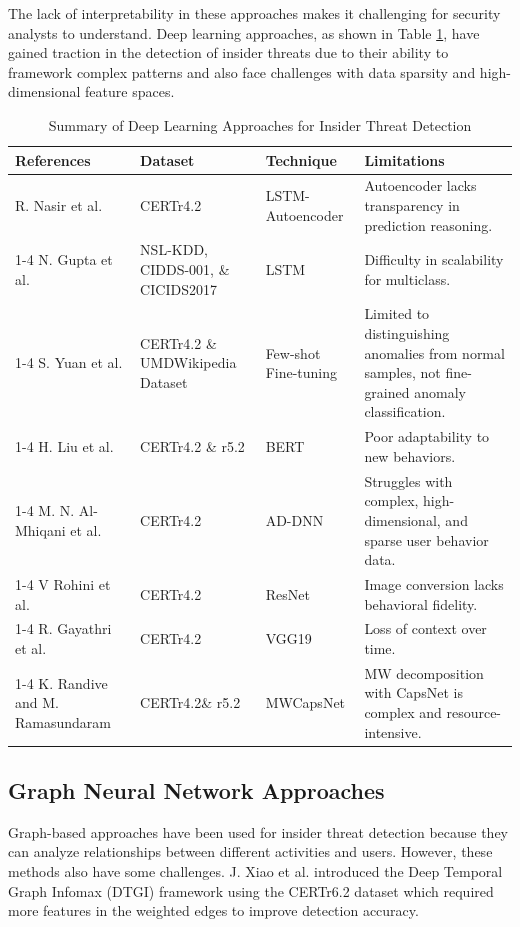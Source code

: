 The lack of interpretability in these approaches makes it challenging for security analysts to understand. Deep learning approaches, as shown in Table \ref{tbl2}, have gained traction in the detection of insider threats due to their ability to framework complex patterns and also face challenges with data sparsity and high-dimensional feature spaces.

\begin{table}[!ht]
\caption{Summary of Deep Learning Approaches for Insider Threat Detection}
\begin{tabular}{  p{2.5cm} p{3cm}  p{2cm}  p{4.5cm} }
\toprule
\textbf{References} & \textbf{Dataset} & \textbf{Technique}  & \textbf{Limitations} \\
\midrule
 R. Nasir et al. \cite{nasir2021behavioral}& CERTr4.2 & LSTM-Autoencoder & Autoencoder lacks transparency in prediction reasoning. \\
\cmidrule(lr){1-4}
 N. Gupta et al. \cite{gupta2021lio} & NSL-KDD, CIDDS-001, \& CICIDS2017 & LSTM & Difficulty in scalability for multiclass. \\
\cmidrule(lr){1-4}
 S. Yuan et al.  \cite{yuan2020few}& CERTr4.2 \& UMDWikipedia Dataset & Few-shot Fine-tuning & Limited to distinguishing anomalies from normal samples, not fine-grained anomaly classification. \\
\cmidrule(lr){1-4}
 H. Liu et al. \cite{liu2025ripple2detect} & CERTr4.2 \& r5.2 & BERT & Poor adaptability to new behaviors.\\

\cmidrule(lr){1-4}
 M. N. Al-Mhiqani et al. \cite{al2021integrated}& CERTr4.2 & AD-DNN & Struggles with complex, high-dimensional, and sparse user behavior data. \\
\cmidrule(lr){1-4}
V Rohini et al. \cite{rohini2024insider}& CERTr4.2& ResNet & Image conversion lacks behavioral fidelity. \\
\cmidrule(lr){1-4}
 R. Gayathri et al. \cite{gayathri2020image}& CERTr4.2 & VGG19 & Loss of context over time. \\
\cmidrule(lr){1-4}
K. Randive and M. Ramasundaram \cite{randive2023mwcapsnet} & CERTr4.2\& r5.2 & MWCapsNet & MW decomposition with CapsNet is complex and resource-intensive. \\
\bottomrule
\end{tabular}

\label{tbl2}
\end{table}


\subsection{Graph Neural Network Approaches}
Graph-based approaches have been used for insider threat detection because they can analyze relationships between different activities and users. 
However, these methods also have some challenges. J. Xiao et al. \cite{xiao2022robust} introduced the Deep Temporal Graph Infomax (DTGI) framework using the CERTr6.2 dataset which required more features in the weighted edges to improve detection accuracy. 

